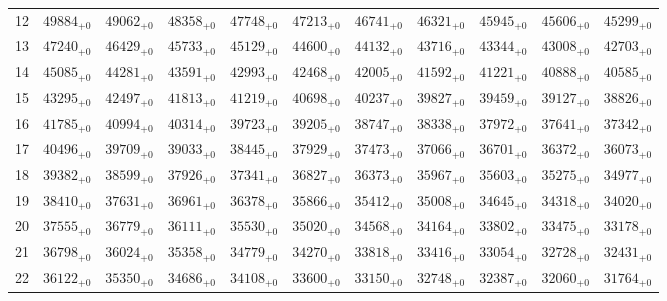 \documentclass[10pt, a4paper]{article}
\begin{document}
\begin{center}
\begin{tabular}{c || c c c c c | c c c c c}
        12 & \({49884}_{+0}\) & \({49062}_{+0}\) & \({48358}_{+0}\) & \({47748}_{+0}\) & \({47213}_{+0}\) & \({46741}_{+0}\) & \({46321}_{+0}\) & \({45945}_{+0}\) & \({45606}_{+0}\) & \({45299}_{+0}\)\\
        13 & \({47240}_{+0}\) & \({46429}_{+0}\) & \({45733}_{+0}\) & \({45129}_{+0}\) & \({44600}_{+0}\) & \({44132}_{+0}\) & \({43716}_{+0}\) & \({43344}_{+0}\) & \({43008}_{+0}\) & \({42703}_{+0}\)\\
        14 & \({45085}_{+0}\) & \({44281}_{+0}\) & \({43591}_{+0}\) & \({42993}_{+0}\) & \({42468}_{+0}\) & \({42005}_{+0}\) & \({41592}_{+0}\) & \({41221}_{+0}\) & \({40888}_{+0}\) & \({40585}_{+0}\)\\
        15 & \({43295}_{+0}\) & \({42497}_{+0}\) & \({41813}_{+0}\) & \({41219}_{+0}\) & \({40698}_{+0}\) & \({40237}_{+0}\) & \({39827}_{+0}\) & \({39459}_{+0}\) & \({39127}_{+0}\) & \({38826}_{+0}\)\\
        \hline
        16 & \({41785}_{+0}\) & \({40994}_{+0}\) & \({40314}_{+0}\) & \({39723}_{+0}\) & \({39205}_{+0}\) & \({38747}_{+0}\) & \({38338}_{+0}\) & \({37972}_{+0}\) & \({37641}_{+0}\) & \({37342}_{+0}\)\\
        17 & \({40496}_{+0}\) & \({39709}_{+0}\) & \({39033}_{+0}\) & \({38445}_{+0}\) & \({37929}_{+0}\) & \({37473}_{+0}\) & \({37066}_{+0}\) & \({36701}_{+0}\) & \({36372}_{+0}\) & \({36073}_{+0}\)\\
        18 & \({39382}_{+0}\) & \({38599}_{+0}\) & \({37926}_{+0}\) & \({37341}_{+0}\) & \({36827}_{+0}\) & \({36373}_{+0}\) & \({35967}_{+0}\) & \({35603}_{+0}\) & \({35275}_{+0}\) & \({34977}_{+0}\)\\
        19 & \({38410}_{+0}\) & \({37631}_{+0}\) & \({36961}_{+0}\) & \({36378}_{+0}\) & \({35866}_{+0}\) & \({35412}_{+0}\) & \({35008}_{+0}\) & \({34645}_{+0}\) & \({34318}_{+0}\) & \({34020}_{+0}\)\\
        20 & \({37555}_{+0}\) & \({36779}_{+0}\) & \({36111}_{+0}\) & \({35530}_{+0}\) & \({35020}_{+0}\) & \({34568}_{+0}\) & \({34164}_{+0}\) & \({33802}_{+0}\) & \({33475}_{+0}\) & \({33178}_{+0}\)\\
        \hline
        21 & \({36798}_{+0}\) & \({36024}_{+0}\) & \({35358}_{+0}\) & \({34779}_{+0}\) & \({34270}_{+0}\) & \({33818}_{+0}\) & \({33416}_{+0}\) & \({33054}_{+0}\) & \({32728}_{+0}\) & \({32431}_{+0}\)\\
        22 & \({36122}_{+0}\) & \({35350}_{+0}\) & \({34686}_{+0}\) & \({34108}_{+0}\) & \({33600}_{+0}\) & \({33150}_{+0}\) & \({32748}_{+0}\) & \({32387}_{+0}\) & \({32060}_{+0}\) & \({31764}_{+0}\)\\

\end{tabular}
\end{center}
\end{document}

